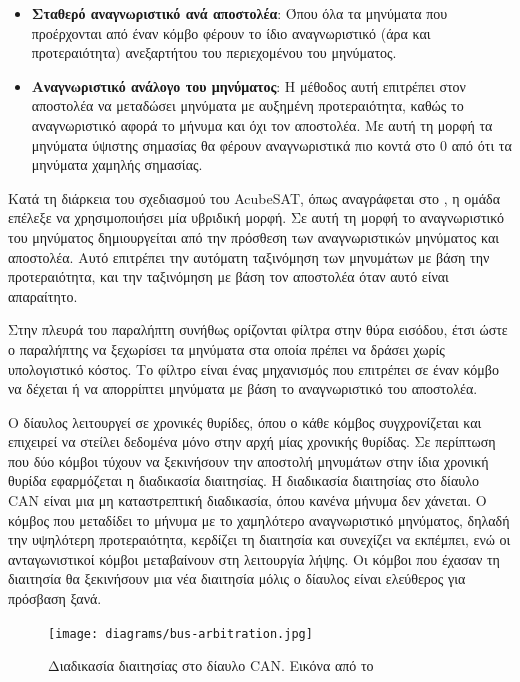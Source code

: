 \documentclass[a4paper,nobib,justified]{tufte-book}
\begin{document}
\begin{itemize}
	\item \textbf{Σταθερό αναγνωριστικό ανά αποστολέα}: Όπου όλα τα μηνύματα που προέρχονται από έναν κόμβο φέρουν το ίδιο αναγνωριστικό (άρα και προτεραιότητα) ανεξαρτήτου του περιεχομένου του μηνύματος.
	\item \textbf{Αναγνωριστικό ανάλογο του μηνύματος}: Η μέθοδος αυτή επιτρέπει στον αποστολέα να μεταδώσει μηνύματα με αυξημένη προτεραιότητα, καθώς το αναγνωριστικό αφορά το μήνυμα και όχι τον αποστολέα. Με αυτή τη μορφή τα μηνύματα ύψιστης σημασίας θα φέρουν αναγνωριστικά πιο κοντά στο 0 από ότι τα μηνύματα χαμηλής σημασίας.
\end{itemize}

Κατά τη διάρκεια του σχεδιασμού του AcubeSAT, όπως αναγράφεται στο , η ομάδα επέλεξε να χρησιμοποιήσει μία υβριδική μορφή. Σε αυτή τη μορφή το αναγνωριστικό του μηνύματος δημιουργείται από την πρόσθεση των αναγνωριστικών μηνύματος και αποστολέα. Αυτό επιτρέπει την αυτόματη ταξινόμηση των μηνυμάτων με βάση την προτεραιότητα, και την ταξινόμηση με βάση τον αποστολέα όταν αυτό είναι απαραίτητο.

Στην πλευρά του παραλήπτη συνήθως ορίζονται φίλτρα στην θύρα εισόδου, έτσι ώστε ο παραλήπτης να ξεχωρίσει τα μηνύματα στα οποία πρέπει να δράσει χωρίς υπολογιστικό κόστος. Το φίλτρο είναι ένας μηχανισμός που επιτρέπει σε έναν κόμβο να δέχεται ή να απορρίπτει μηνύματα με βάση το αναγνωριστικό του αποστολέα.

Ο δίαυλος λειτουργεί σε χρονικές θυρίδες, όπου ο κάθε κόμβος συγχρονίζεται και επιχειρεί να στείλει δεδομένα μόνο στην αρχή μίας χρονικής θυρίδας. Σε περίπτωση που δύο κόμβοι τύχουν να ξεκινήσουν την αποστολή μηνυμάτων στην ίδια χρονική θυρίδα εφαρμόζεται η διαδικασία διαιτησίας. Η διαδικασία διαιτησίας στο δίαυλο CAN είναι μια μη καταστρεπτική διαδικασία, όπου κανένα μήνυμα δεν χάνεται. Ο κόμβος που μεταδίδει το μήνυμα με το χαμηλότερο αναγνωριστικό μηνύματος, δηλαδή την υψηλότερη προτεραιότητα, κερδίζει τη διαιτησία και συνεχίζει να εκπέμπει, ενώ οι ανταγωνιστικοί κόμβοι μεταβαίνουν στη λειτουργία λήψης. Οι κόμβοι που έχασαν τη διαιτησία θα ξεκινήσουν μια νέα διαιτησία μόλις ο δίαυλος είναι ελεύθερος για πρόσβαση ξανά.

\begin{figure}
	\centering
	\texttt{[image: diagrams/bus-arbitration.jpg]}
	\label{fig:arbitration}
	\caption[Διαδικασία διαιτησίας στο δίαυλο CAN]{Διαδικασία διαιτησίας στο δίαυλο CAN. Εικόνα από το \cite{comprehensibleguidetocan}}
\end{figure}
\end{document}
